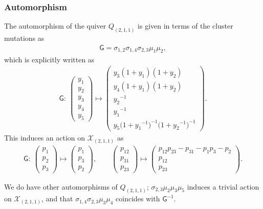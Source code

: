 \documentclass[pdftex]{sigma}
\numberwithin{equation}{section}
\begin{document}
\subsubsection*{Automorphism}
The automorphism of the quiver $Q_{(2,1,1)}$ is given in terms of the cluster mutations as
\begin{gather} \label{G_211}
 \mathsf{G} = \sigma_{1,2} \sigma_{1,4} \sigma_{2,3} \mu_1 \mu_2 ,
\end{gather}
which is explicitly written as
\begin{gather*}
 \mathsf{G} \colon \
 \begin{pmatrix}
 y_1 \\ y_2 \\ y_3 \\ y_4 \\ y_5
 \end{pmatrix}
 \mapsto
 \begin{pmatrix}
 y_3 (1+y_1 ) ( 1+ y_2 ) \\
 y_4(1+y_1) ( 1+ y_2 ) \\
 {y_2}^{-1} \\
 {y_1}^{-1} \\
 y_5 \big(1+{y_1}^{-1} \big)^{-1} \big( 1+ {y_2}^{-1} \big)^{-1}
 \end{pmatrix} .
\end{gather*}
This induces an action on $\mathcal{X}_{(2,1,1)}$ as
\begin{gather*}
 \mathsf{G}\colon \
 \begin{pmatrix}
 p_1 \\ p_2 \\ p_3
 \end{pmatrix}
 \mapsto
 \begin{pmatrix}
 p_1 \\ p_3 \\ p_2
 \end{pmatrix},
 \qquad
 \begin{pmatrix}
 p_{12} \\ p_{31} \\ p_{23}
 \end{pmatrix}
 \mapsto
 \begin{pmatrix}
 p_{12} p_{23} - p_{31} - p_1 p_3 - p_2 \\
 p_{12} \\
 p_{23}
 \end{pmatrix} .
\end{gather*}

We do have other automorphisms of $Q_{(2,1,1)}$; $\sigma_{2,3} \mu_2 \mu_3 \mu_5$ induces a trivial action on $\mathcal{X}_{(2,1,1)}$, and that $\sigma_{1,4} \sigma_{2,3} \mu_3 \mu_4$ coincides with ${\mathsf{G}}^{-1}$.
\end{document}
